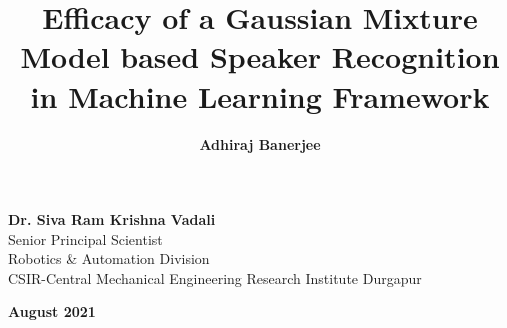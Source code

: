 \documentclass{article}
\title{\textbf{Efficacy of a Gaussian Mixture Model based Speaker Recognition in Machine Learning Framework}}
\author{\textbf{Adhiraj Banerjee}}
\begin{document}
\vspace{-3em}
\maketitle
\thispagestyle{empty}
\vspace{-3em}
\begin{center}{\textbf{Dr. Siva Ram Krishna Vadali}\\ Senior Principal Scientist \\ Robotics \& Automation Division\\ 
CSIR-Central Mechanical Engineering Research Institute Durgapur\\}
\end{center}
\vspace{1em}
\begin{center}{\textbf{August 2021}}
\end{center}
\newpage
\tableofcontents
\newpage
\listoffigures
\newpage
\end{document}
